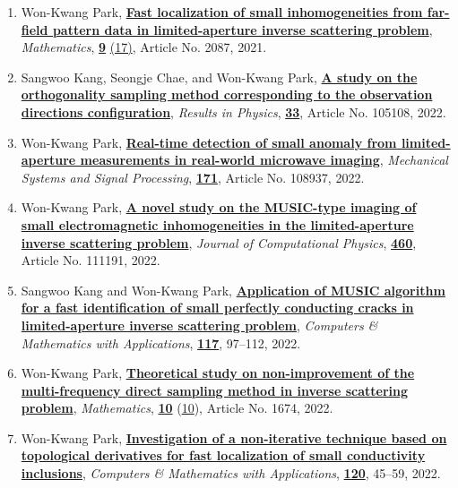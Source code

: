 \documentclass[10pt,A4]{article}
\begin{document}
\begin{enumerate}
\item\label{A-MATH2021B} Won-Kwang Park, \href{https://doi.org/10.3390/math9172087}{\textbf{Fast localization of small inhomogeneities from far-field pattern data in limited-aperture inverse scattering problem}}, \textit{Mathematics}, \href{https://www.mdpi.com/2227-7390/9}{\textbf{9}} \href{https://www.mdpi.com/2227-7390/9/17}{(17)}, Article No. 2087, 2021.
\item\label{A-RINP2022} Sangwoo Kang, Seongje Chae, and Won-Kwang Park, \href{https://doi.org/10.1016/j.rinp.2021.105108}{\textbf{A study on the orthogonality sampling method corresponding to the observation directions configuration}}, \textit{Results in Physics}, \href{https://www.sciencedirect.com/science/journal/22113797/33/supp/C}{\textbf{33}}, Article No. 105108, 2022.
\item\label{A-MSSP2022} Won-Kwang Park, \href{https://doi.org/10.1016/j.ymssp.2022.108937}{\textbf{Real-time detection of small anomaly from limited-aperture measurements in real-world microwave imaging}}, \textit{Mechanical Systems and Signal Processing}, \href{https://www.sciencedirect.com/journal/mechanical-systems-and-signal-processing/vol/171/suppl/C}{\textbf{171}}, Article No. 108937, 2022.
\item\label{A-JCOMP2022A} Won-Kwang Park, \href{https://doi.org/10.1016/j.jcp.2022.111191}{\textbf{A novel study on the MUSIC-type imaging of small electromagnetic inhomogeneities in the limited-aperture inverse scattering problem}}, \textit{Journal of Computational Physics}, \href{https://www.sciencedirect.com/journal/journal-of-computational-physics/vol/460/suppl/C}{\textbf{460}}, Article No. 111191, 2022.
\item\label{A-CAMWA2022A} Sangwoo Kang and Won-Kwang Park, \href{https://doi.org/10.1016/j.camwa.2022.04.015}{\textbf{Application of MUSIC algorithm for a fast identification of small perfectly conducting cracks in limited-aperture inverse scattering problem}}, \textit{Computers \& Mathematics with Applications}, \href{https://www.sciencedirect.com/journal/computers-and-mathematics-with-applications/vol/117/suppl/C}{\textbf{117}}, 97--112, 2022.
\item\label{A-MATH2022} Won-Kwang Park, \href{https://doi.org/10.3390/math10101674}{\textbf{Theoretical study on non-improvement of the multi-frequency direct sampling method in inverse scattering problem}}, \textit{Mathematics}, \href{https://www.mdpi.com/2227-7390/10}{\textbf{10}} (\href{https://www.mdpi.com/2227-7390/10/10}{10}), Article No. 1674, 2022.
\item\label{A-CAMWA2022B} Won-Kwang Park, \href{https://doi.org/10.1016/j.camwa.2022.06.022}{\textbf{Investigation of a non-iterative technique based on topological derivatives for fast localization of small conductivity inclusions}}, \textit{Computers \& Mathematics with Applications}, \href{https://www.sciencedirect.com/journal/computers-and-mathematics-with-applications/vol/120/suppl/C}{\textbf{120}}, 45--59, 2022.

\end{enumerate}
\end{document}
